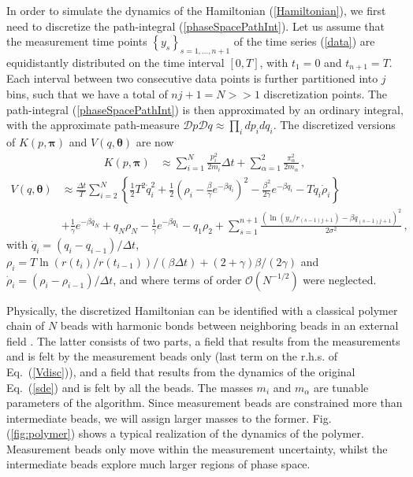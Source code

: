 \documentclass[11pt]{article}
\theoremstyle{definition}
\newcommand{\bt}{\pmb\theta}
\begin{document}
In order to simulate the dynamics of the Hamiltonian (\ref{Hamiltonian}), we first need to discretize the path-integral (\ref{phaseSpacePathInt}).
Let us assume that the measurement time points $\left\{ y_s \right\}_{s=1,\dots, n+1}$ of the time series (\ref{data}) are equidistantly distributed on the time interval $[0,T]$, with $t_1=0$ and $t_{n+1}=T$.
Each interval between two consecutive data points is further partitioned into $j$ bins, such that we have a total of $nj+1=N>>1$ discretization points.
The path-integral (\ref{phaseSpacePathInt}) is then approximated by an ordinary integral, with the approximate path-measure $  \mathcal Dp\mathcal Dq  \approx  \prod_i dp_i dq_i$.
The discretized versions of $K( p,{\pmb\pi})$ and $V( q,\bt)$ are now
\begin{align}
   K( p,{\pmb\pi}) &\approx
   \sum_{i=1}^N
   \frac{ p_i^2}{2m_i}\Delta t
   +
   \sum_{\alpha=1}^2\frac{\pi_\alpha^2}{2m_\alpha}\,,\label{Kdisc}
\end{align}
\begin{align} \label{Vdisc}
  V(q,\bt)  &\approx \frac{\Delta t}{T} \sum_{i=2}^{N}
   \left\{ \frac{1}{2} T^2 \dot q_i^2 + \frac{1}{2}
     \left( \rho_i-\frac{\beta}{\gamma}e^{-\beta q_i} \right)^2 -
    \frac{\beta^2}{2\gamma} e^{-\beta q_i} - T q_i\dot\rho_i \right\}
  \\ \nonumber
  &+
  \frac{1}{\gamma} e^{-\beta q_N} + q_N \rho_{N} - \frac{1}{\gamma} e^{-\beta q_1} -  q_1 \rho_{2} +
  \sum_{s=1}^{n+1} \frac{(\ln(y_s/r_{(s-1)j+1}) - {\beta q_{(s-1)j+1}})^2}{2\sigma^2}\,,
\end{align}
with $\dot q_i = (q_i-q_{i-1})/\Delta t$, $\rho_i = T \ln(r(t_{i})/r(t_{i-1}))/(\beta\Delta t)+(2+\gamma)\beta/(2\gamma)$ and $\dot\rho_i = (\rho_i-\rho_{i-1})/\Delta t$, and where terms of order $\mathcal O(N^{-1/2})$ were neglected.

Physically, the discretized Hamiltonian can be identified with a classical polymer chain of $N$ beads with harmonic bonds between neighboring beads in an external field \cite{chandler_1981_polymer}.
The latter consists of two parts, a field that results from the measurements and is felt by the measurement beads only (last term on the r.h.s. of Eq.~(\ref{Vdisc})), and a field that results from the dynamics of the original Eq.~(\ref{sde}) and is felt by all the beads.
The masses $m_i$ and $m_{\alpha}$ are tunable parameters of the algorithm. Since measurement beads are constrained more than intermediate beads, we will assign larger masses to the former. 
Fig. (\ref{fig:polymer}) shows a typical realization of the dynamics of the polymer. 
Measurement beads only move within the measurement uncertainty, whilst the intermediate beads explore much larger regions of phase space.
\end{document}
